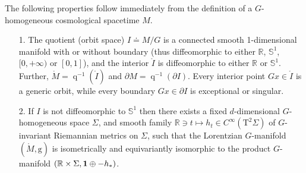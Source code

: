 \documentclass{article}
\begin{document}
\begin{proposition}\label{GHomCosmSTProp} The following properties follow immediately from the definition of a $G$-homogeneous cosmological spacetime $M$.

\begin{itemize}

\item[1.] The quotient (orbit space) $I\doteq M/G$ is a connected smooth 1-dimensional manifold with or without boundary (thus diffeomorphic to either $\mathbb{R}$, $\mathbb{S}^1$, $[0,+\infty)$ or $[0,1]$), and the interior $\mathring I$ is diffeomorphic to either $\mathbb{R}$ or $\mathbb{S}^1$. Further, $\mathring M=\operatorname{q}^{-1}(\mathring I)$ and $\partial M=\operatorname{q}^{-1}(\partial I)$. Every interior point $Gx\in\mathring I$ is a generic orbit, while every boundary $Gx\in\partial I$ is exceptional or singular.

\item[2.] If $I$ is not diffeomorphic to $\mathbb{S}^1$ then there exists a fixed $d$-dimensional $G$-homogeneous space $\Sigma$, and smooth family $\mathbb{R}\ni t\mapsto h_t\in C^\infty(\mathrm{T}^2\Sigma)$ of $G$-invariant Riemannian metrics on $\Sigma$, such that the Lorentzian $G$-manifold $(\mathring M,\mathrm{g})$ is isometrically and equivariantly isomorphic to the product $G$-manifold $(\mathbb{R}\times\Sigma,{\mathbf 1}\oplus-h_*)$.

\end{itemize}
\end{proposition}
\end{document}
